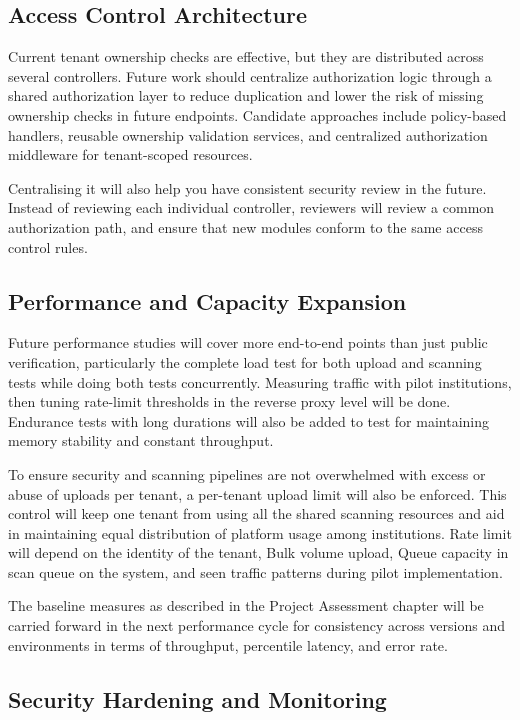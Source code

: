 \subsection{Access Control Architecture}

Current tenant ownership checks are effective, but they are distributed across
several controllers. Future work should centralize authorization logic through
a shared authorization layer to reduce duplication and lower the risk of
missing ownership checks in future endpoints. Candidate approaches include
policy-based handlers, reusable ownership validation services, and centralized
authorization middleware for tenant-scoped resources.

Centralising it will also help you have consistent security review in the future. Instead of reviewing each individual controller, reviewers will review a common authorization path, and ensure that new modules conform to the same access control rules.

\subsection{Performance and Capacity Expansion}

Future performance studies will cover more end-to-end points than just public verification, particularly the complete load test for both upload and scanning tests while doing both tests concurrently. Measuring traffic with pilot institutions, then tuning rate-limit thresholds in the reverse proxy level will be done. Endurance tests with long durations will also be added to test for maintaining memory stability and constant throughput.

To ensure security and scanning pipelines are not overwhelmed with excess or abuse of uploads per tenant, a per-tenant upload limit will also be enforced.  This control will keep one tenant from using all the shared scanning resources and aid in maintaining equal distribution of platform usage among institutions. Rate limit will depend on the identity of the tenant, Bulk volume upload, Queue capacity in scan queue on the system, and seen traffic patterns during pilot implementation.

The baseline measures as described in the Project Assessment chapter will be carried forward in the next performance cycle for consistency across versions and environments in terms of throughput, percentile latency, and error rate.

\subsection{Security Hardening and Monitoring}

